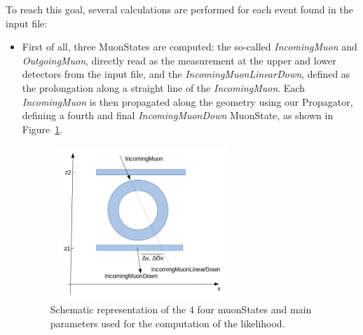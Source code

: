 \documentclass[a4paper, 11pt, twoside, openright]{report}
\begin{document}
To reach this goal, several calculations are performed for each event found in the input file: 
\begin{itemize}
\item First of all, three MuonStates are computed: the so-called \textit{IncomingMuon} and \textit{OutgoingMuon}, directly read as the measurement at the upper and lower detectors from the input file, and the \textit{IncomingMuonLinearDown}, defined as the prolongation along a straight line of the \textit{IncomingMuon}. Each \textit{IncomingMuon} is then propagated along the geometry using our Propagator, defining a fourth and final \textit{IncomingMuonDown} MuonState, as shown in Figure~\ref{fig:parameters}.

\begin{figure}[htbp]
\centering
\begin{minipage}[b]{.49\textwidth}
\includegraphics[width=7cm, height=5.8cm]{figs/parameters.png}
\end{minipage}\hfill
\caption{Schematic representation of the 4 four muonStates and main parameters used for the computation of the likelihood.}
\label{fig:parameters}
\end{figure}


\end{itemize}
\end{document}

